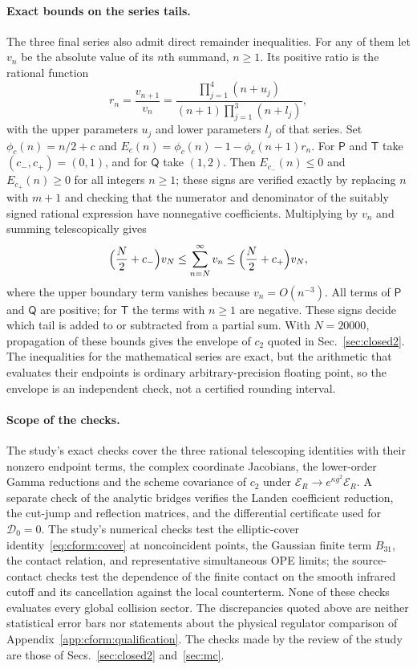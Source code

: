\documentclass[11pt,a4paper]{article}
\numberwithin{equation}{section}
\begin{document}
\paragraph{Exact bounds on the series tails.} The three final series also admit direct remainder inequalities. For any
of them let $v_n$ be the absolute value of its $n$th summand, $n\ge1$. Its positive ratio is the rational function
\begin{equation}
 r_n=\frac{v_{n+1}}{v_n}=\frac{\prod_{j=1}^4(n+u_j)}{(n+1)\prod_{j=1}^3(n+l_j)},
\end{equation}
with the upper parameters $u_j$ and lower parameters $l_j$ of that series. Set $\phi_c(n)=n/2+c$ and
$E_c(n)=\phi_c(n)-1-\phi_c(n+1)r_n$. For $\mathsf P$ and $\mathsf T$ take $(c_-,c_+)=(0,1)$, and for $\mathsf Q$ take
$(1,2)$. Then $E_{c_-}(n)\le0$ and $E_{c_+}(n)\ge0$ for all integers $n\ge1$; these signs are verified exactly by
replacing $n$ with $m+1$ and checking that the numerator and denominator of the suitably signed rational expression
have nonnegative coefficients. Multiplying by $v_n$ and summing telescopically gives
\begin{equation}
 \Bigl(\frac N2+c_-\Bigr)v_N\le\sum_{n=N}^\infty v_n\le\Bigl(\frac N2+c_+\Bigr)v_N,
\end{equation}
where the upper boundary term vanishes because $v_n=O(n^{-3})$. All terms of $\mathsf P$ and $\mathsf Q$ are positive;
for $\mathsf T$ the terms with $n\ge1$ are negative. These signs decide which tail is added to or subtracted from a
partial sum. With $N=20000$, propagation of these bounds gives the envelope of $c_2$ quoted in Sec.~\ref{sec:closed2}.
The inequalities for the mathematical series are exact, but the arithmetic that evaluates their endpoints is ordinary
arbitrary-precision floating point, so the envelope is an independent check, not a certified rounding interval.

\paragraph{Scope of the checks.} The study's exact checks cover the three rational telescoping identities with their
nonzero endpoint terms, the complex coordinate Jacobians, the lower-order Gamma reductions and the scheme covariance
of $c_2$ under $\mathcal E_R\to e^{\kappa g^2}\mathcal E_R$. A separate check of the analytic bridges verifies the
Landen coefficient reduction, the cut-jump and reflection matrices, and the differential certificate used for
$\mathcal D_0=0$. The study's numerical checks test the elliptic-cover identity~\eqref{eq:cform:cover} at noncoincident
points,
the Gaussian finite term $B_{31}$, the contact relation, and representative simultaneous OPE limits; the source-contact checks
test the dependence of the finite contact on the smooth infrared cutoff and its cancellation against the local
counterterm. None of these checks evaluates every global collision sector. The discrepancies quoted above are
neither statistical error bars nor statements about the physical regulator comparison of
Appendix~\ref{app:cform:qualification}. The checks made by the review of the study are those of
Secs.~\ref{sec:closed2} and~\ref{sec:mc}.
\end{document}
